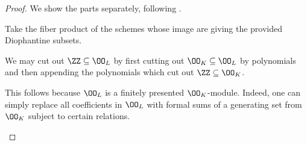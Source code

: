 \documentclass[../notes.tex]{subfiles}
\begin{document}
\begin{proof}
	We show the parts separately, following \cite[Proposition~1]{denef-lipshitz-diophantine}.
	\begin{listalph}
		\item Take the fiber product of the schemes whose image are giving the provided Diophantine subsets.
		\item We may cut out $\ZZ\subseteq\OO_L$ by first cutting out $\OO_K\subseteq\OO_L$ by polynomials and then appending the polynomials which cut out $\ZZ\subseteq\OO_K$.
		\item This follows because $\OO_L$ is a finitely presented $\OO_K$-module. Indeed, one can simply replace all coefficients in $\OO_L$ with formal sums of a generating set from $\OO_K$ subject to certain relations.
		\qedhere
	\end{listalph}
\end{proof}
\end{document}
